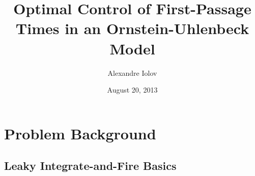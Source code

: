 \documentclass{beamer}
\title[Spike-Control for Neurons]{Optimal Control of First-Passage Times
in an Ornstein-Uhlenbeck Model
}
\author{Alexandre Iolov}
\date{August 20, 2013}
\begin{document}
\begin{frame}
\titlepage
\end{frame}

\begin{frame}
\tableofcontents[pausesections]
\end{frame}

\section{Problem Background}
\subsection[LIFs]{Leaky Integrate-and-Fire Basics}
\end{document}
